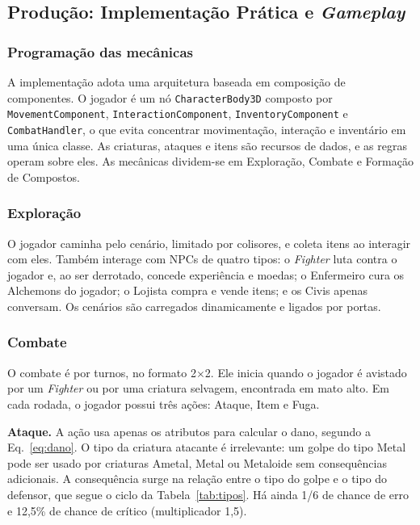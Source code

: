 \subsection{Produção: Implementação Prática e \textit{Gameplay}}

\subsubsection{Programação das mecânicas}
A implementação adota uma arquitetura baseada em composição de componentes. O jogador é um nó \texttt{CharacterBody3D} composto por \texttt{MovementComponent}, \texttt{InteractionComponent}, \texttt{InventoryComponent} e \texttt{CombatHandler}, o que evita concentrar movimentação, interação e inventário em uma única classe. As criaturas, ataques e itens são recursos de dados, e as regras operam sobre eles. As mecânicas dividem-se em Exploração, Combate e Formação de Compostos.

\subsubsection{Exploração}
O jogador caminha pelo cenário, limitado por colisores, e coleta itens ao interagir com eles. Também interage com NPCs de quatro tipos: o \textit{Fighter} luta contra o jogador e, ao ser derrotado, concede experiência e moedas; o Enfermeiro cura os Alchemons do jogador; o Lojista compra e vende itens; e os Civis apenas conversam. Os cenários são carregados dinamicamente e ligados por portas.

\subsubsection{Combate}
O combate é por turnos, no formato 2$\times$2. Ele inicia quando o jogador é avistado por um \textit{Fighter} ou por uma criatura selvagem, encontrada em mato alto. Em cada rodada, o jogador possui três ações: Ataque, Item e Fuga.

\textbf{Ataque.} A ação usa apenas os atributos para calcular o dano, segundo a Eq.~\ref{eq:dano}. O tipo da criatura atacante é irrelevante: um golpe do tipo Metal pode ser usado por criaturas Ametal, Metal ou Metaloide sem consequências adicionais. A consequência surge na relação entre o tipo do golpe e o tipo do defensor, que segue o ciclo da Tabela~\ref{tab:tipos}. Há ainda 1/6 de chance de erro e 12,5\% de chance de crítico (multiplicador 1,5).

